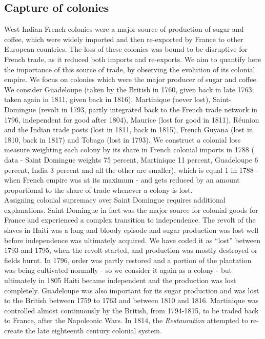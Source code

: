 \documentclass[12pt,a4paper,notitlepage,english]{article}
\begin{document}
\subsection{Capture of colonies}
West Indian French colonies were a major source of production of sugar and coffee, which were widely imported and then re-exported by France to other European countries. The loss of these colonies was bound to be disruptive for French trade, as it reduced both imports and re-exports. 
We aim to quantify here the importance of this source of trade, by observing the evolution of its colonial empire.    
We focus on colonies which were the major producer of sugar and coffee. We consider Guadeloupe (taken by the British in 1760, given back in late 1763; taken again in 1811, given back in 1816), Martinique (never lost), Saint-Domingue (revolt in 1793, partly integrated back to the French trade network in 1796, independent for good after 1804), Maurice (lost for good in 1811), Réunion and the Indian trade posts (lost in 1811, back in 1815), French Guyana (lost in 1810, back in 1817) and Tobago (lost in 1793). 
We construct a colonial loss measure weighting each colony by its share in French colonial imports in 1788 (\cite{Daudin2020} data - Saint Domingue weights 75 percent, Martinique 11 percent, Guadeloupe 6 percent, India 3 percent and all the other are smaller), which is equal 1 in 1788 - when French empire was at its maximum - and gets reduced by an amount proportional to the share of trade whenever a colony is lost. \\
Assigning colonial supremacy over Saint Domingue requires additional explanations. Saint Domingue in fact was the major source for colonial goods for France and experienced a complex transition to independence. 
The revolt of the slaves in Haiti was a long and bloody episode and sugar production was lost well before independence was ultimately acquired.
We have coded it as ``lost'' between 1793 and 1795, when the revolt started, and production was mostly destroyed or fields burnt.
In 1796, order was partly restored and a portion of the plantation was being cultivated normally - so we consider it again as a colony - but ultimately in 1805 Haiti became independent and the production was lost completely.
Guadeloupe was also important for its sugar production and was lost to the British between 1759 to 1763 and between 1810 and 1816.
Martinique was controlled almost continuously by the British, from 1794-1815, to be traded back to France, after the Napoleonic Wars.
In 1814, the \textit{Restauration} attempted to re-create the late eighteenth century colonial system.
\end{document}
